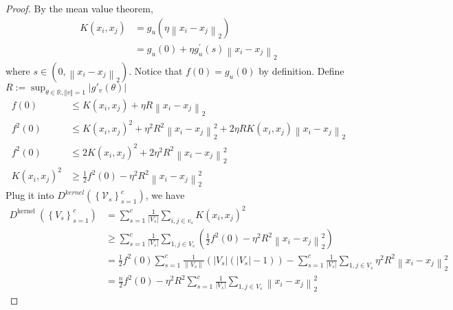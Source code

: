 \documentclass[12pt, a4paper, oneside]{article}
\begin{document}
\begin{proof}
By the mean value theorem,
\begin{equation}
	\begin{aligned}
		K\left(x_{i}, x_{j}\right) &=g_{u}\left(\eta\left\|x_{i}-x_{j}\right\|_{2}\right) \\
		&=g_{u}(0)+\eta g_{u}^{\prime}(s)\left\|x_{i}-x_{j}\right\|_{2}
	\end{aligned}
\end{equation}
where $s \in\left(0,\left\|x_{i}-x_{j}\right\|_{2}\right)$.
Notice that $f(0)=g_{u}(0)$ by definition. Define $R:=\sup _{\theta \in \mathbb{R}, \Vert v \Vert = 1}|g'_v(\theta)|$
\begin{equation}
	\begin{aligned}
		f(0) &\leqslant K\left(x_{i}, x_{j}\right)+\eta R\left\|x_{i}-x_{j}\right\|_{2} \\
		f^{2}(0) &\leqslant K\left(x_{i}, x_{j}\right)^{2}+\eta^{2} R^{2}\left\|x_{i}-x_{j}\right\|_{2}^{2}+2 \eta R K\left(x_{i}, x_{j}\right)\left\|x_{i}-x_{j}\right\|_{2} \\
		f^{2}(0) & \leqslant 2 K\left(x_{i}, x_{j}\right)^{2}+2 \eta^{2} R^{2}\left\|x_{i}-x_{j}\right\|_{2}^{2} \\
		K\left(x_{i}, x_{j}\right)^{2} & \geqslant \frac{1}{2} f^{2}(0)-\eta^{2} R^{2}\left\|x_{i}-x_{j}\right\|_{2}^{2}
	\end{aligned}
\end{equation}
Plug it into $D^{k e r n e l}\left(\left\{\mathcal{V}_{s}\right\}_{s=1}^{c}\right)$, we have
\begin{equation}
	\label{eq:dkernel}
\begin{aligned}
	D^{\text {kernel }}\left(\left\{V_{s}\right\}_{s=1}^{c}\right) &=\sum_{s=1}^{c} \frac{1}{\left|V_{s}\right|} \sum_{i, j \in v_{s}} K\left(x_{i}, x_{j}\right)^{2} \\
	&\geqslant \sum_{s=1}^{c} \frac{1}{\left|V_{s}\right|} \sum_{1, j \in V_{s}}\left(\frac{1}{2} f^{2}(0)-\eta^{2} R^{2}\left\|x_{i}-x_{j}\right\|_{2}^{2}\right) \\
	&= \frac{1}{2} f^{2}(0) \sum_{s=1}^{c} \frac{1}{\| V_{s }\|}\left(\left|V_{s}\right|\left(\left|V_{s}\right|-1\right)\right) - \sum_{s=1}^{c} \frac{1}{\left|V_{s}\right|} \sum_{1, j \in V_{s}} \eta^{2} R^{2}\left\|x_{i}-x_{j}\right\|_{2}^{2} \\
	&= \frac{n}{2}f^{2}(0) - \eta^{2} R^{2} \sum_{s=1}^{c} \frac{1}{\left|V_{s}\right|} \sum_{1, j \in V_{s}} \left\|x_{i}-x_{j}\right\|_{2}^{2}
\end{aligned}

\end{equation}
\end{proof}
\end{document}
